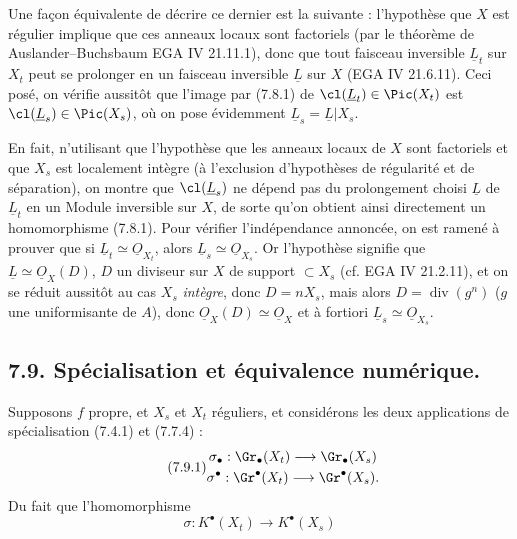 
Une façon
équivalente de décrire ce dernier est la suivante : l'hypothèse que \(X\) est régulier implique que ces anneaux locaux sont factoriels (par le théorème de Auslander--Buchsbaum EGA IV 21.11.1), donc que tout faisceau inversible \(\underline{L}_t\) sur \(X_t\) peut se prolonger en un faisceau inversible \(\underline{L}\) sur \(X\) (EGA IV 21.6.11). Ceci posé, on vérifie aussitôt que l'image par (7.8.1) de \(\cl(\underline{L}_t)\in\Pic(X_t)\) est \(\cl(\underline{L}_s)\in\Pic(X_s)\), où on pose évidemment \(\underline{L}_s=\underline{L}|X_s\).

En fait, n'utilisant que l'hypothèse que les anneaux locaux de \(X\) sont factoriels et que \(X_s\) est localement intègre (à l'exclusion d'hypothèses de régularité et de séparation), on montre que \(\cl(\underline{L}_s)\) ne dépend pas du prolongement choisi \(\underline{L}\) de \(\underline{L}_t\) en un Module inversible sur \(X\), de sorte qu'on obtient ainsi directement un homomorphisme (7.8.1). Pour vérifier l'indépendance annoncée, on est ramené à prouver que si \(\underline{L}_t\simeq\underline{O}_{X_t}\), alors \(\underline{L}_s\simeq\underline{O}_{X_s}\). Or l'hypothèse signifie que \(\underline{L}\simeq\underline{O}_X(D)\), \(D\) un diviseur sur \(X\) de support \(\subset X_s\) (cf. EGA IV 21.2.11), et on se réduit aussitôt au cas \(X_s\) \emph{intègre}, donc \(D=nX_s\), mais alors \(D=\operatorname{div}(g^n)\) (\(g\) une uniformisante de \(A\)), donc \(\underline{O}_X(D)\simeq\underline{O}_X\) et à fortiori \(\underline{L}_s\simeq\underline{O}_{X_s}\).

\subsection*{7.9. Spécialisation et équivalence numérique.}
Supposons \(f\) propre, et \(X_s\) et \(X_t\) réguliers, et considérons les deux applications de spécialisation (7.4.1) et (7.7.4) :
\begin{equation}\tag{7.9.1}
\begin{gathered}
  \sigma_\bullet:\Gr_\bullet(X_t)\longrightarrow\Gr_\bullet(X_s)\\
  \sigma^\bullet:\Gr^\bullet(X_t)\longrightarrow\Gr^\bullet(X_s).
\end{gathered}
\end{equation}
Du fait que l'homomorphisme
\begin{equation}\tag{7.9.2}
  \sigma:K^\bullet(X_t)\longrightarrow K^\bullet(X_s)
\end{equation}
